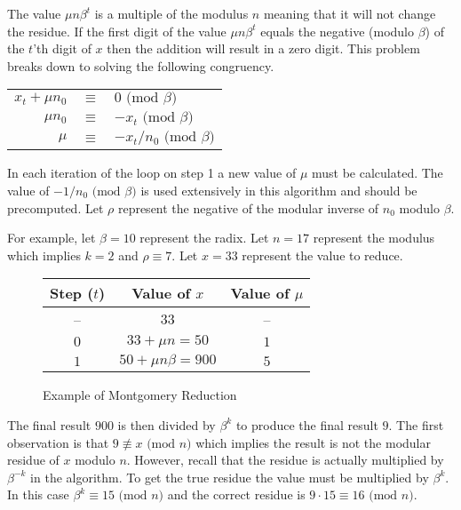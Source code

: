 \documentclass[b5paper]{book}
\def\nequiv{\not\equiv}
\begin{document}
The value $\mu n \beta^t$ is a multiple of the modulus $n$ meaning that it will not change the residue.  If the first digit of 
the value $\mu n \beta^t$ equals the negative (modulo $\beta$) of the $t$'th digit of $x$ then the addition will result in a zero digit.  This
problem breaks down to solving the following congruency.  

\begin{center}
\begin{tabular}{rcl}
$x_t + \mu n_0$ & $\equiv$ & $0 \mbox{ (mod }\beta\mbox{)}$ \\
$\mu n_0$ & $\equiv$ & $-x_t \mbox{ (mod }\beta\mbox{)}$ \\
$\mu$ & $\equiv$ & $-x_t/n_0 \mbox{ (mod }\beta\mbox{)}$ \\
\end{tabular}
\end{center}

In each iteration of the loop on step 1 a new value of $\mu$ must be calculated.  The value of $-1/n_0 \mbox{ (mod }\beta\mbox{)}$ is used 
extensively in this algorithm and should be precomputed.  Let $\rho$ represent the negative of the modular inverse of $n_0$ modulo $\beta$.  

For example, let $\beta = 10$ represent the radix.  Let $n = 17$ represent the modulus which implies $k = 2$ and $\rho \equiv 7$.  Let $x = 33$ 
represent the value to reduce.

\newpage\begin{figure}
\begin{center}
\begin{tabular}{|c|c|c|}
\hline \textbf{Step ($t$)} & \textbf{Value of $x$} & \textbf{Value of $\mu$} \\
\hline --                 & $33$ & --\\
\hline $0$                 & $33 + \mu n = 50$ & $1$ \\
\hline $1$                 & $50 + \mu n \beta = 900$ & $5$ \\
\hline
\end{tabular}
\end{center}
\caption{Example of Montgomery Reduction}
\end{figure}

The final result $900$ is then divided by $\beta^k$ to produce the final result $9$.  The first observation is that $9 \nequiv x \mbox{ (mod }n\mbox{)}$ 
which implies the result is not the modular residue of $x$ modulo $n$.  However, recall that the residue is actually multiplied by $\beta^{-k}$ in
the algorithm.  To get the true residue the value must be multiplied by $\beta^k$.  In this case $\beta^k \equiv 15 \mbox{ (mod }n\mbox{)}$ and
the correct residue is $9 \cdot 15 \equiv 16 \mbox{ (mod }n\mbox{)}$.  
\end{document}
